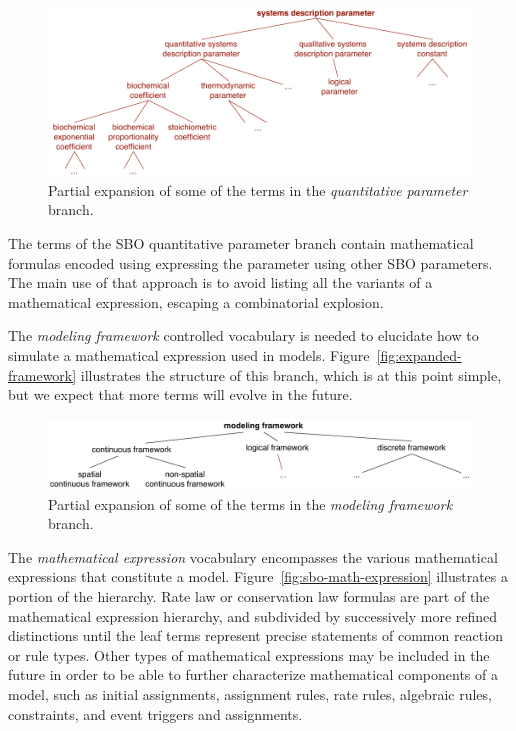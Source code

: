 \begin{figure}[tbh]
  \vspace*{1ex}
  \centering
  \includegraphics[scale = 0.8]{figs/sbo-quantitative-parameter}
  \caption{Partial expansion of some of the terms in the \emph{quantitative
      parameter} branch.}
  \label{fig:expanded-parameter}
\end{figure}

The terms of the SBO quantitative  parameter branch contain
mathematical formulas encoded using \mathmltwo
expressing the parameter using other SBO parameters.  The
main use of that approach is to avoid listing all the variants of a
mathematical expression, escaping a combinatorial explosion.

The \emph{modeling framework} controlled vocabulary is needed to
elucidate how to simulate a mathematical expression used in models.  Figure~\vref{fig:expanded-framework}
illustrates the structure of this branch, which is at this point
 simple, but we expect that more terms will evolve in the
future.

\begin{figure}[tbh]
  \centering
  \vspace{-1ex}
  \includegraphics[scale = 0.83]{figs/sbo-framework}
  \caption{Partial expansion of some of the terms in the
    \emph{modeling framework} branch.}
  \label{fig:expanded-framework}
\end{figure}

The \emph{mathematical expression} vocabulary encompasses the
various mathematical expressions that constitute a model.
Figure~\vref{fig:sbo-math-expression} illustrates a portion of the
hierarchy.  Rate law or conservation law formulas are part of the mathematical
expression hierarchy, and subdivided by successively more refined
distinctions until the leaf terms represent precise statements of
common reaction or rule types.  Other types of mathematical expressions
may be included in the future in order to be
able to further characterize mathematical components of a model, such as initial assignments, assignment rules, rate rules,
algebraic rules, constraints, and event triggers and assignments.

